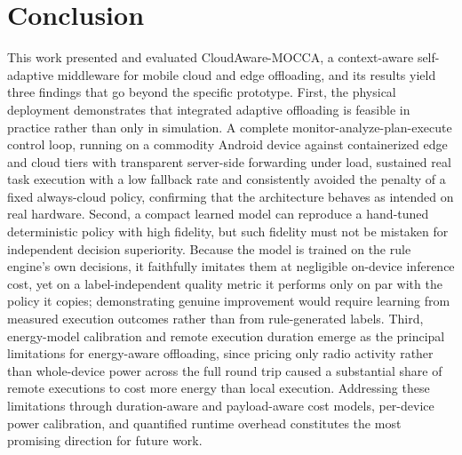 \section{Conclusion}
\label{sec:conclusion}

This work presented and evaluated CloudAware-MOCCA, a context-aware
self-adaptive middleware for mobile cloud and edge offloading, and its results
yield three findings that go beyond the specific prototype. First, the physical
deployment demonstrates that integrated adaptive offloading is feasible in
practice rather than only in simulation. A complete monitor-analyze-plan-execute
control loop, running on a commodity Android device against containerized edge
and cloud tiers with transparent server-side forwarding under load, sustained
real task execution with a low fallback rate and consistently avoided the
penalty of a fixed always-cloud policy, confirming that the architecture behaves
as intended on real hardware. Second, a compact learned model can reproduce a
hand-tuned deterministic policy with high fidelity, but such fidelity must not be
mistaken for independent decision superiority. Because the model is trained on
the rule engine's own decisions, it faithfully imitates them at negligible
on-device inference cost, yet on a label-independent quality metric it performs
only on par with the policy it copies; demonstrating genuine improvement would
require learning from measured execution outcomes rather than from
rule-generated labels. Third, energy-model calibration and remote execution
duration emerge as the principal limitations for energy-aware offloading, since
pricing only radio activity rather than whole-device power across the full round
trip caused a substantial share of remote executions to cost more energy than
local execution. Addressing these limitations through duration-aware and
payload-aware cost models, per-device power calibration, and quantified runtime
overhead constitutes the most promising direction for future work.
